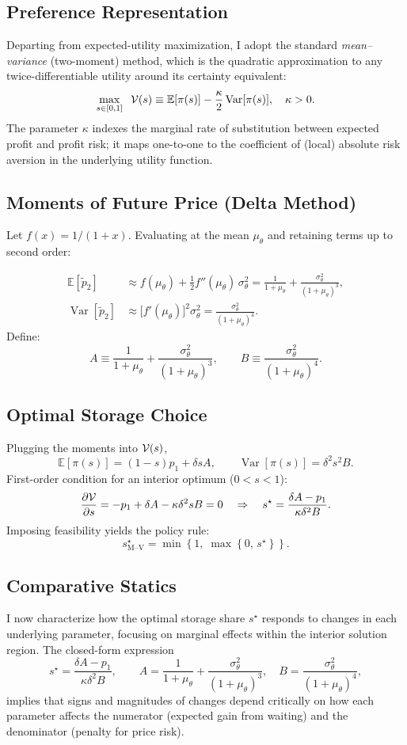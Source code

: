 \subsection{Preference Representation}
\noindent
Departing from expected-utility maximization, I adopt the standard \textit{mean–variance} (two-moment) method, which is the quadratic approximation to any twice-differentiable utility around its certainty equivalent:
$$
\max_{s\in[0,1]}
\;\;{\cal V}(s)
\equiv
\mathbb E[\pi(s)]
-\frac{\kappa}{2}\operatorname{Var}[\pi(s)],
\quad\kappa>0.
$$
The parameter \(\kappa\) indexes the marginal rate of substitution between expected profit and profit risk; it maps one-to-one to the coefficient of (local) absolute risk aversion in the underlying utility function.

\subsection{Moments of Future Price (Delta Method)}
\noindent
Let $f(x)=1/(1+x)$. Evaluating at the mean $\mu_\theta$ and retaining terms up to second order:

$$
\begin{aligned}
\mathbb E[\tilde p_{2}]
&\approx f(\mu_\theta)+\tfrac12 f''(\mu_\theta)\,\sigma_\theta^{2}
= \frac{1}{1+\mu_\theta}
  +\frac{\sigma_\theta^{2}}{(1+\mu_\theta)^{3}},\\[6pt]
\operatorname{Var}[\tilde p_{2}]
&\approx\bigl[f'(\mu_\theta)\bigr]^{2}\sigma_\theta^{2}
= \frac{\sigma_\theta^{2}}{(1+\mu_\theta)^{4}}.
\end{aligned}
$$
Define:
$$
A \equiv \frac{1}{1+\mu_\theta} + \frac{\sigma_\theta^2}{(1+\mu_\theta)^3},\qquad
B \equiv \frac{\sigma_\theta^2}{(1+\mu_\theta)^4}.
$$

\subsection{Optimal Storage Choice}
\noindent
Plugging the moments into \({\cal V}(s)\),
$$
\mathbb E[\pi(s)]       =(1-s)p_{1}+\delta sA,
\qquad
\operatorname{Var}[\pi(s)]=\delta^{2}s^{2}B.
$$
First-order condition for an interior optimum (\(0<s<1\)):
$$
\frac{\partial{\cal V}}{\partial s}
= -p_{1}+\delta A - \kappa\delta^{2}sB = 0
\quad\Rightarrow\quad
s^{\star} = \frac{\delta A - p_1}{\kappa \delta^2 B}.
$$
Imposing feasibility yields the policy rule:
$$
s^{\star}_\text{M--V} = \min\left\{1,\;\max\left\{0,\,s^{\star}\right\}\right\}.
$$

\subsection{Comparative Statics}
\noindent
I now characterize how the optimal storage share \(s^{\star}\) responds to changes in each underlying parameter, focusing on marginal effects within the interior solution region. The closed-form expression
$$
s^{\star} = \frac{\delta A - p_1}{\kappa \delta^2 B},
\qquad
A = \frac{1}{1 + \mu_\theta} + \frac{\sigma_\theta^2}{(1 + \mu_\theta)^3},
\quad
B = \frac{\sigma_\theta^2}{(1 + \mu_\theta)^4},
$$
implies that signs and magnitudes of changes depend critically on how each parameter affects the numerator (expected gain from waiting) and the denominator (penalty for price risk).

